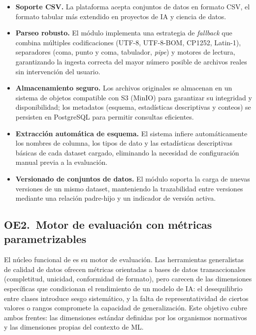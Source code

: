 \begin{itemize}
  \item \textbf{Soporte \ac{CSV}.}  La plataforma acepta conjuntos de datos
    en formato \ac{CSV}, el formato tabular más extendido en proyectos de
    \ac{IA} y ciencia de datos.

  \item \textbf{Parseo robusto.}  El módulo implementa una estrategia de
    \emph{fallback} que combina múltiples codificaciones (UTF-8, UTF-8-BOM,
    CP1252, Latin-1), separadores (coma, punto y coma, tabulador,
    \emph{pipe}) y motores de lectura, garantizando la ingesta correcta del
    mayor número posible de archivos reales sin intervención del usuario.

  \item \textbf{Almacenamiento seguro.}  Los archivos originales se
    almacenan en un sistema de objetos compatible con S3 (MinIO) para
    garantizar su integridad y disponibilidad; los metadatos (esquema,
    estadísticas descriptivas y conteos) se persisten en PostgreSQL para
    permitir consultas eficientes.

  \item \textbf{Extracción automática de esquema.}  El sistema infiere
    automáticamente los nombres de columna, los tipos de dato y las
    estadísticas descriptivas básicas de cada dataset cargado, eliminando
    la necesidad de configuración manual previa a la evaluación.

  \item \textbf{Versionado de conjuntos de datos.}  El módulo soporta la
    carga de nuevas versiones de un mismo dataset, manteniendo la
    trazabilidad entre versiones mediante una relación padre-hijo y un
    indicador de versión activa.
\end{itemize}


\subsection{OE2.\ Motor de evaluación con métricas parametrizables}
\label{sec:oe2}

El núcleo funcional de \dataqual es su motor de evaluación.  Las herramientas
generalistas de calidad de datos ofrecen métricas orientadas a bases de datos
transaccionales (completitud, unicidad, conformidad de formato), pero carecen
de las dimensiones específicas que condicionan el rendimiento de un modelo de
\ac{IA}: el desequilibrio entre clases introduce sesgo sistemático, y la falta
de representatividad de ciertos valores o rangos compromete la capacidad de
generalización.  Este objetivo cubre ambos frentes: las dimensiones estándar
definidas por los organismos normativos y las dimensiones propias del contexto
de \ac{ML}.

